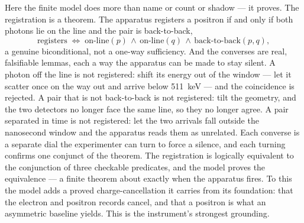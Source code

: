 Here the finite model does more than name or count or shadow --- it proves. The registration is a theorem. The
apparatus registers a positron if and only if both photons lie on the line and the pair is back-to-back,
\begin{equation}
  \text{registers} \;\Longleftrightarrow\; \text{on-line}(p) \,\wedge\, \text{on-line}(q) \,\wedge\,
  \text{back-to-back}(p, q),
\end{equation}
a genuine biconditional, not a one-way sufficiency. And the converses are real, falsifiable lemmas, each a way
the apparatus can be made to stay silent. A photon off the line is not registered: shift its energy out of the
window --- let it scatter once on the way out and arrive below 511~keV --- and the coincidence is rejected. A
pair that is not back-to-back is not registered: tilt the geometry, and the two detectors no longer face the
same line, so they no longer agree. A pair separated in time is not registered: let the two arrivals fall
outside the nanosecond window and the apparatus reads them as unrelated. Each converse is a separate dial the
experimenter can turn to force a silence, and each turning confirms one conjunct of the theorem. The
registration is logically equivalent to the conjunction of three checkable predicates, and the model proves the
equivalence --- a finite theorem about exactly when the apparatus fires. To this the model adds a proved
charge-cancellation it carries from its foundation: that the electron and positron records cancel, and that a
positron is what an asymmetric baseline yields. This is the instrument's strongest grounding.

